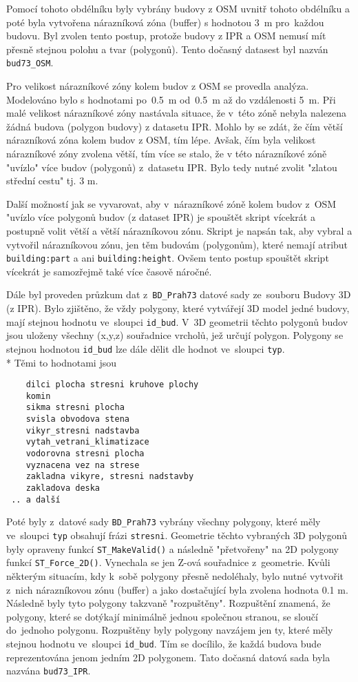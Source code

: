 Pomocí tohoto obdélníku byly vybrány budovy z OSM uvnitř tohoto
obdélníku a poté byla vytvořena nárazníková zóna (buffer) s hodnotou
3~m pro~každou budovu. Byl zvolen tento postup, protože budovy z IPR a
OSM nemusí mít přesně stejnou polohu a tvar (polygonů). Tento dočasný
datasest byl nazván {\tt bud73\_OSM}.

Pro velikost nárazníkové zóny kolem budov z OSM se provedla analýza.
Modelováno bylo s hodnotami po~0.5~m od~0.5~m až do vzdálenosti 5~m.
Při malé velikost nárazníkové zóny nastávala situace, že v~této zóně
nebyla nalezena žádná budova (polygon budovy) z datasetu IPR. Mohlo by
se zdát, že čím větší nárazníková zóna kolem budov z OSM, tím lépe.
Avšak, čím byla velikost nárazníkové zóny zvolena větší, tím více se
stalo, že v této nárazníkové zóně "uvízlo" více budov (polygonů)
z~datasetu IPR. Bylo tedy nutné zvolit "zlatou střední cestu" tj. 3 m.

Další možností jak se vyvarovat, aby v~nárazníkové zóně kolem budov
z~OSM "uvízlo více polygonů budov (z dataset IPR) je spouštět skript
vícekrát a postupně volit větší a větší nárazníkovou zónu. Skript je
napsán tak, aby vybral a vytvořil nárazníkovou zónu, jen těm budovám
(polygonům), které nemají atribut {\tt building:part} a ani
{\tt building:height}. Ovšem tento postup spouštět skript vícekrát je
samozřejmě také více časově náročné.

Dále byl proveden průzkum dat z~{\tt BD\_Prah73} datové sady
ze~souboru Budovy 3D (z IPR). Bylo zjištěno, že vždy polygony, které
vytvářejí 3D model jedné budovy, mají stejnou hodnotu ve~sloupci
{\tt id\_bud}. V~3D geometrii těchto polygonů budov jsou uloženy
všechny (x,y,z) souřadnice vrcholů, jež určují polygon. Polygony se
stejnou hodnotou {\tt id\_bud} lze dále dělit dle hodnot
ve~sloupci {\tt typ}.
\\*
Těmi to hodnotami jsou
\begin{verbatim}
    dilci plocha stresni kruhove plochy
    komin
    sikma stresni plocha
    svisla obvodova stena
    vikyr_stresni nadstavba
    vytah_vetrani_klimatizace
    vodorovna stresni plocha
    vyznacena vez na strese
    zakladna vikyre, stresni nadstavby
    zakladova deska
 .. a další
\end{verbatim}

Poté byly z~datové sady {\tt BD\_Prah73} vybrány všechny polygony,
které měly ve~sloupci {\tt typ} obsahují frázi {\tt stresni}.
Geometrie těchto vybraných 3D polygonů byly opraveny funkcí
{\tt ST\_MakeValid()} a následně "přetvořeny" na 2D polygony funkcí
{\tt ST\_Force\_2D()}. Vynechala se jen Z-ová souřadnice z~geometrie.
Kvůli některým situacím, kdy k~sobě polygony přesně nedoléhaly, bylo
nutné vytvořit z~nich nárazníkovou zónu (buffer) a jako dostačující
byla zvolena hodnota 0.1 m. Následně byly tyto polygony takzvaně
"rozpuštěny". Rozpuštění znamená, že polygony, které se dotýkají
minimálně jednou společnou stranou, se sloučí do~jednoho polygonu.
Rozpuštěny byly polygony navzájem jen ty, které měly stejnou hodnotu
ve~sloupci {\tt id\_bud}. Tím se docílilo, že každá budova bude
reprezentována jenom jedním 2D polygonem. Tato dočasná datová sada
byla nazvána {\tt bud73\_IPR}.

